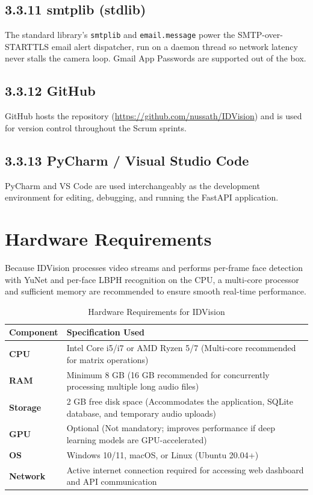 \documentclass[11pt]{report}
\begin{document}
\subsection*{3.3.11 smtplib (stdlib)}
The standard library's \texttt{smtplib} and \texttt{email.message} power the SMTP-over-STARTTLS email alert dispatcher, run on a daemon thread so network latency never stalls the camera loop. Gmail App Passwords are supported out of the box.

\subsection*{3.3.12 GitHub}
GitHub hosts the repository (\url{https://github.com/nussath/IDVision}) and is used for version control throughout the Scrum sprints.

\subsection*{3.3.13 PyCharm / Visual Studio Code}
PyCharm and VS Code are used interchangeably as the development environment for editing, debugging, and running the FastAPI application.
\section{Hardware Requirements}
Because IDVision processes video streams and performs per-frame face detection with YuNet and per-face LBPH recognition on the CPU, a multi-core processor and sufficient memory are recommended to ensure smooth real-time performance.

\begin{table}[h]
\centering
\renewcommand{\arraystretch}{1.5}
\begin{tabular}{|p{}|p{}|}
\hline
\textbf{Component} & \textbf{Specification Used} \\
\hline
\textbf{CPU} & Intel Core i5/i7 or AMD Ryzen 5/7 (Multi-core recommended for matrix operations) \\
\hline
\textbf{RAM} & Minimum 8 GB (16 GB recommended for concurrently processing multiple long audio files) \\
\hline
\textbf{Storage} & 2 GB free disk space (Accommodates the application, SQLite database, and temporary audio uploads) \\
\hline
\textbf{GPU} & Optional (Not mandatory; improves performance if deep learning models are GPU-accelerated) \\
\hline
\textbf{OS} & Windows 10/11, macOS, or Linux (Ubuntu 20.04+) \\
\hline
\textbf{Network} & Active internet connection required for accessing web dashboard and API communication\\
\hline
\end{tabular}
\caption{Hardware Requirements for IDVision}
\label{tab:hardware_reqs}
\end{table}
\clearpage
\end{document}
